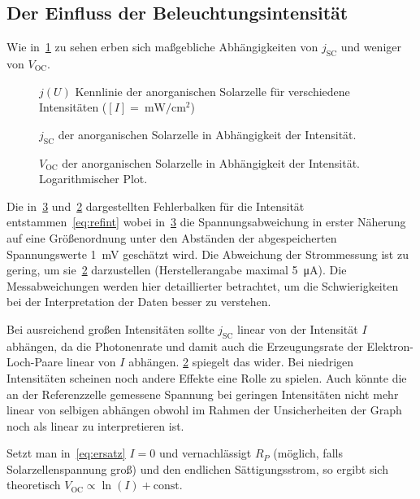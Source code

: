 \documentclass[slug=SZ, room=Hermann-Krone-Bau\,\ Labor\ 1.25,
supervisor=Martin\ Kroll, coursedate=14.\ 11.\ 2019]{../../Lab_Report_LaTeX/lab_report}
\newcommand{\mwcm}[1]{\SI{#1}{\milli\watt\per\centi\meter^2}}
\newcommand{\voc}{V_{\text{OC}}}
\newcommand{\jsc}{j_{\text{SC}}}
\begin{document}
\subsection{Der Einfluss der Beleuchtungsintensität}
\label{sec:auswintens}

Wie in~\ref{fig:b-all} zu sehen erben sich ma\ss{}gebliche
Abh\"angigkeiten von \(\jsc\) und weniger von \(\voc\).
\begin{figure}[H]\centering
  
  \caption{\(j(U)\) Kennlinie der anorganischen Solarzelle f\"ur
    verschiedene Intensitäten (\([I] = \mwcm{}\))}
  \label{fig:b-all}
\end{figure}
\begin{figure}[H]\centering
  
  \caption{\(\jsc\)  der anorganischen Solarzelle in
    Abhängigkeit der Intensität.}
  \label{fig:b-jsc}
\end{figure}
\begin{figure}[H]\centering
  
  \caption{\(\voc\) der anorganischen Solarzelle in
    Abhängigkeit der Intensität. Logarithmischer Plot.}
  \label{fig:b-voc}
\end{figure}


Die in~\ref{fig:b-voc} und~\ref{fig:b-jsc} dargestellten Fehlerbalken
f\"ur die Intensit\"at entstammen~\eqref{eq:refint} wobei
in~\ref{fig:b-voc} die Spannungsabweichung in erster N\"aherung auf
eine Gr\"o\ss{}enordnung unter den Abst\"anden der abgespeicherten
Spannungswerte \SI{1}{\milli\volt} gesch\"atzt wird. Die Abweichung
der Strommessung ist zu gering, um sie~\ref{fig:b-jsc} darzustellen
(Herstellerangabe maximal \SI{5}{\micro\ampere}). Die Messabweichungen
werden hier detaillierter betrachtet, um die Schwierigkeiten bei der
Interpretation der Daten besser zu verstehen.

Bei ausreichend gro\ss{}en Intensit\"aten sollte \(\jsc\) linear von
der Intensit\"at \(I\) abh\"angen, da die Photonenrate und damit auch
die Erzeugungsrate der Elektron-Loch-Paare linear von \(I\)
abh\"angen. \ref{fig:b-jsc} spiegelt das wider. Bei niedrigen
Intensit\"aten scheinen noch andere Effekte eine Rolle zu
spielen. Auch k\"onnte die an der Referenzzelle gemessene Spannung bei
geringen Intensit\"aten nicht mehr linear von selbigen abh\"angen
obwohl im Rahmen der Unsicherheiten der Graph noch als linear zu
interpretieren ist.

Setzt man in~\eqref{eq:ersatz} \(I=0\) und vernachl\"assigt \(R_P\)
(m\"oglich, falls Solarzellenspannung gro\ss{}) und den endlichen
S\"attigungsstrom, so ergibt sich theoretisch
\(\voc\propto\ln(I) + \text{const}\).
\end{document}
